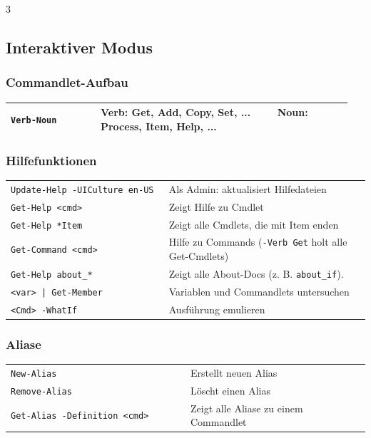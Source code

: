 \documentclass[
11pt,
footheight=40pt
]{scrartcl}
\newif\ifhilfe \hilfetrue
\newif\ifcmdlet \cmdlettrue
\newif\ifalias \aliastrue
\begin{document}
\begin{paracol}{3} %

    \switchcolumn[0] %
    \subsection*{Interaktiver Modus}
    \ifcmdlet
	\subsubsection*{Commandlet-Aufbau}
	\begin{tabular}{|p{0.25\linewidth } p{0.70\linewidth}|}
	\hline
	    \texttt{Verb-Noun} & \textbf{Verb:} Get, Add, Copy, Set, ... \ \ \ \ \textbf{Noun:} Process, Item, Help, ... \\ \hline
	\end{tabular}
	\fi
	
    \ifhilfe
    \subsubsection*{Hilfefunktionen}
    \begin{tabular}{p{0.44\linewidth} p{0.56\linewidth}}
	    \rowcolor{lightblue}\texttt{Update-Help -UICulture en-US} & Als Admin: aktualisiert Hilfedateien \\
	    \texttt{Get-Help <cmd>} & Zeigt Hilfe zu Cmdlet \\
	    \texttt{Get-Help *Item} & Zeigt alle Cmdlets, die mit Item enden\\
	    \rowcolor{lightblue}\texttt{Get-Command <cmd>} & Hilfe zu Commands (\texttt{-Verb Get} holt alle Get-Cmdlets) \\
	    \texttt{Get-Help about\_*} & Zeigt alle About-Docs (z. B. \texttt{about\_if}). \\
	    \rowcolor{lightblue} \texttt{<var> | Get-Member} & Variablen und Commandlets untersuchen \\
	    \texttt{<Cmd> -WhatIf} & Ausführung emulieren 
	\end{tabular}
	\fi
	
	\ifalias 
	\subsubsection*{Aliase}
	\begin{tabular}{p{0.5\linewidth} p{0.5\linewidth}}
	    \rowcolor{lightgray} \texttt{New-Alias} & Erstellt neuen Alias \\
	     \texttt{Remove-Alias} & Löscht einen Alias \\
	     \rowcolor{lightgray} \texttt{Get-Alias -Definition <cmd>} & Zeigt alle Aliase zu einem Commandlet \\
	\end{tabular} 
	\fi
	

\end{paracol}
\end{document}
